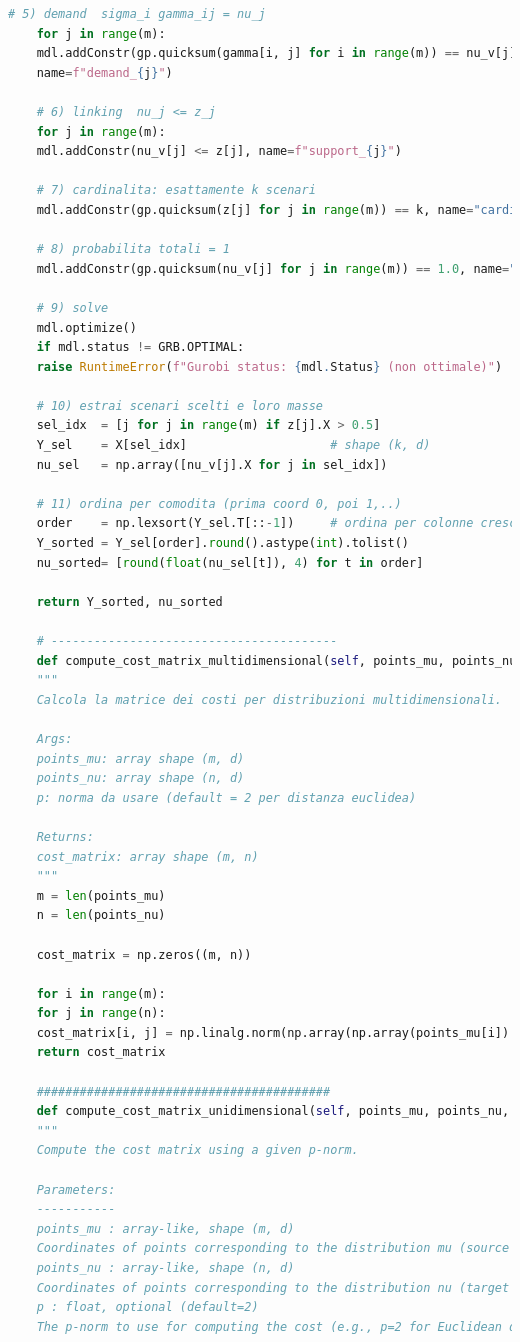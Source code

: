 \documentclass[a4paper,12pt]{article}
\begin{document}
\begin{lstlisting}[language=python,caption={class ScenarioTree},label={lst:class-scenario-tree}]
	# 5) demand  sigma_i gamma_ij = nu_j
	for j in range(m):
	mdl.addConstr(gp.quicksum(gamma[i, j] for i in range(m)) == nu_v[j],
	name=f"demand_{j}")
	
	# 6) linking  nu_j <= z_j
	for j in range(m):
	mdl.addConstr(nu_v[j] <= z[j], name=f"support_{j}")
	
	# 7) cardinalita: esattamente k scenari
	mdl.addConstr(gp.quicksum(z[j] for j in range(m)) == k, name="cardinality")
	
	# 8) probabilita totali = 1
	mdl.addConstr(gp.quicksum(nu_v[j] for j in range(m)) == 1.0, name="sum_prob")
	
	# 9) solve
	mdl.optimize()
	if mdl.status != GRB.OPTIMAL:
	raise RuntimeError(f"Gurobi status: {mdl.Status} (non ottimale)")
	
	# 10) estrai scenari scelti e loro masse
	sel_idx  = [j for j in range(m) if z[j].X > 0.5]
	Y_sel    = X[sel_idx]                    # shape (k, d)
	nu_sel   = np.array([nu_v[j].X for j in sel_idx])
	
	# 11) ordina per comodita (prima coord 0, poi 1,..)
	order    = np.lexsort(Y_sel.T[::-1])     # ordina per colonne crescenti
	Y_sorted = Y_sel[order].round().astype(int).tolist()
	nu_sorted= [round(float(nu_sel[t]), 4) for t in order]
	
	return Y_sorted, nu_sorted
	
	# ----------------------------------------	
	def compute_cost_matrix_multidimensional(self, points_mu, points_nu, p=2):
	"""
	Calcola la matrice dei costi per distribuzioni multidimensionali.
	
	Args:
	points_mu: array shape (m, d)
	points_nu: array shape (n, d)
	p: norma da usare (default = 2 per distanza euclidea)
	
	Returns:
	cost_matrix: array shape (m, n)
	"""
	m = len(points_mu)
	n = len(points_nu)
	
	cost_matrix = np.zeros((m, n))
	
	for i in range(m):
	for j in range(n):
	cost_matrix[i, j] = np.linalg.norm(np.array(np.array(points_mu[i]) - np.array(points_nu[j])), ord=p)
	return cost_matrix
	
	#########################################
	def compute_cost_matrix_unidimensional(self, points_mu, points_nu, p=2):
	"""
	Compute the cost matrix using a given p-norm.
	
	Parameters:
	-----------
	points_mu : array-like, shape (m, d)
	Coordinates of points corresponding to the distribution mu (source points).
	points_nu : array-like, shape (n, d)
	Coordinates of points corresponding to the distribution nu (target points).
	p : float, optional (default=2)
	The p-norm to use for computing the cost (e.g., p=2 for Euclidean distance, p=1 for Manhattan distance).
	

\end{lstlisting}
\end{document}
